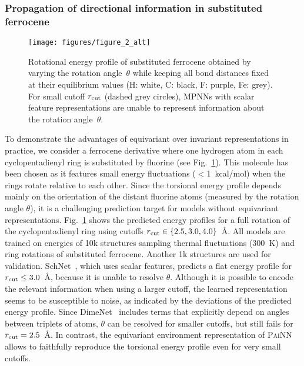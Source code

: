 \documentclass[reprint,
amsmath,amssymb,
 aip,jcp
]{revtex4-2}
\newcommand{\painn}{\textsc{PaiNN}}
\begin{document}
\subsubsection{Propagation of directional information in substituted ferrocene}\label{sec:ferrocene}
\begin{figure}[tb]
\centering
\texttt{[image: figures/figure\_2\_alt]}
\caption{Rotational energy profile of substituted ferrocene obtained by varying the rotation angle~$\theta$ while keeping all bond distances fixed at their equilibrium values (H: white, C: black, F: purple, Fe: grey). For small cutoff $r_{\rm cut}$ (dashed grey circles), MPNNs with scalar feature representations are unable to represent information about the rotation angle~$\theta$.}
\label{fig:ferrocene_rotation}
\end{figure}

To demonstrate the advantages of equivariant over invariant representations in practice, we consider a ferrocene derivative where one hydrogen atom in each cyclopentadienyl ring is substituted by fluorine (see Fig.~\ref{fig:ferrocene_rotation}).
This molecule has been chosen as it features small energy fluctuations ($<$1~kcal/mol) when the rings rotate relative to each other. 
Since the torsional energy profile depends mainly on the orientation of the distant fluorine atoms (measured by the rotation angle $\theta$), it is a challenging prediction target for models without equivariant representations.
Fig.~\ref{fig:ferrocene_rotation} shows the predicted energy profiles for a full rotation of the cyclopentadienyl ring using cutoffs $r_{\rm cut} \in \{ 2.5, 3.0, 4.0 \}$~\AA.
All models are trained on energies of 10k structures sampling thermal fluctuations (300~K) and ring rotations of substituted ferrocene.
Another 1k structures are used for validation.
SchNet~\cite{schutt2017schnet}, which uses scalar features, predicts a flat energy profile for $r_{\rm cut} \leq 3.0$~\AA, because it is unable to resolve $\theta$.
Although it is possible to encode the relevant information when using a larger cutoff, the learned representation seems to be susceptible to noise, as indicated by the deviations of the predicted energy profile. 
Since DimeNet~\cite{klicpera2020directional} includes terms that explicitly depend on angles between triplets of atoms, $\theta$ can be resolved for smaller cutoffs, but still fails for $r_{\rm cut} = 2.5$~\AA.
In contrast, the equivariant environment representation of \painn{} allows to faithfully reproduce the torsional energy profile even for very small cutoffs.  
\end{document}
